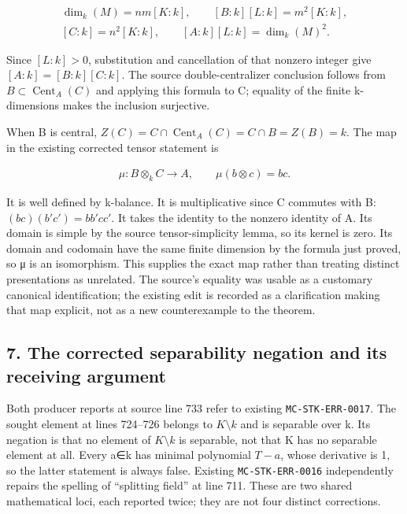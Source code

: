 \[\begin{gathered}
\operatorname{dim}_{k}(M)=nm[K:k],\qquad [B:k][L:k]=m^{2}[K:k],\\{}[C:k]=n^{2}[K:k],\qquad [A:k][L:k]=\operatorname{dim}_{k}(M)^{2}.
\end{gathered}\]

Since \([L:k]>0\), substitution and cancellation of that nonzero integer give \([A:k]=[B:k][C:k]\). The source double-centralizer conclusion follows from \(B\subset \operatorname{Cent}_{A}(C)\) and applying this formula to C; equality of the finite k-dimensions makes the inclusion surjective.

When B is central, \(Z(C)=C\cap \operatorname{Cent}_{A}(C)=C\cap B=Z(B)=k\). The map in the existing corrected tensor statement is

\[\begin{gathered}
\mu :B\otimes _{k} C\to A,\qquad \mu (b\otimes c)=bc.
\end{gathered}\]

It is well defined by k-balance. It is multiplicative since C commutes with B: \((bc)(b'c')=bb'cc'\). It takes the identity to the nonzero identity of A. Its domain is simple by the source tensor-simplicity lemma, so its kernel is zero. Its domain and codomain have the same finite dimension by the formula just proved, so μ is an isomorphism. This supplies the exact map rather than treating distinct presentations as unrelated. The source's equality was usable as a customary canonical identification; the existing edit is recorded as a clarification making that map explicit, not as a new counterexample to the theorem.

\subsection{7. The corrected separability negation and its receiving argument}\label{the-corrected-separability-negation-and-its-receiving-argument}

Both producer reports at source line 733 refer to existing \texttt{MC-STK-ERR-0017}. The sought element at lines 724--726 belongs to \(K\setminus k\) and is separable over k. Its negation is that no element of \(K\setminus k\) is separable, not that K has no separable element at all. Every a∈k has minimal polynomial \(T-a\), whose derivative is 1, so the latter statement is always false. Existing \texttt{MC-STK-ERR-0016} independently repairs the spelling of ``splitting field'' at line 711. These are two shared mathematical loci, each reported twice; they are not four distinct corrections.

